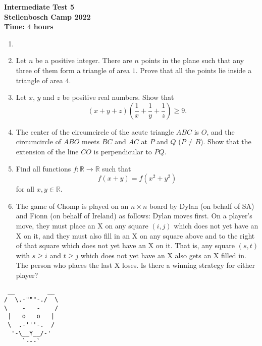 \documentclass{article}
\begin{document}
\thispagestyle{empty}

\begin{center}
  \textbf{\Large Intermediate Test 5}
  \\ \vspace{1em}
  \textbf{\large Stellenbosch Camp 2022}
  \\ \vspace{1em}
  \textbf{\large Time: $4$ hours}
\end{center}

\bigskip

\begin{enumerate}[itemsep=\fill]

\item %

 
\item %
Let $n$ be a positive integer. There are $n$ points in the plane such that any three of them form a triangle of area $1$. Prove that all the points lie inside a triangle of area $4$. 


\item %
Let $x$, $y$ and $z$ be positive real numbers. Show that 
$$ (x+y+z)\left(\frac{1}{x}+\frac{1}{y}+\frac{1}{z}\right) \geq 9. $$

\vspace{-12pt}


\item %
The center of the circumcircle of the acute triangle $ABC$ is $O$, and the circumcircle of $ABO$ meets $BC$ and $AC$ at $P$ and $Q$ ($P\neq B$).
Show that the extension of the line $CO$ is perpendicular to $PQ$.


\item %
Find all functions $f : \mathbb{R} \to \mathbb{R}$ such that \[ f(x+y) = f(x^2+y^2) \] for all $x,y \in \mathbb{R}$.


\item %
The game of Chomp is played on an $n \times n$ board by Dylan (on behalf of SA) and Fionn (on behalf of Ireland) as follows: Dylan moves first.
On a player's move, they must place an X on any square $(i, j)$ which does not yet have an X on it, and they must also fill in an X on any square above and to the right of that square which does not yet have an X on it.
That is, any square $(s, t)$ with $s \geq i$ and $t \geq j$ which does not yet have an X also gets an X filled in.
The person who places the last X loses.
Is there a winning strategy for either player?

\end{enumerate}


\vfill
\centering
\small
\begin{BVerbatim}
 __         __
/  \.-"""-./  \
\    -   -    /
 |   o   o   |
 \  .-'''-.  /
  '-\__Y__/-'
     `---`
\end{BVerbatim}
\end{document}
